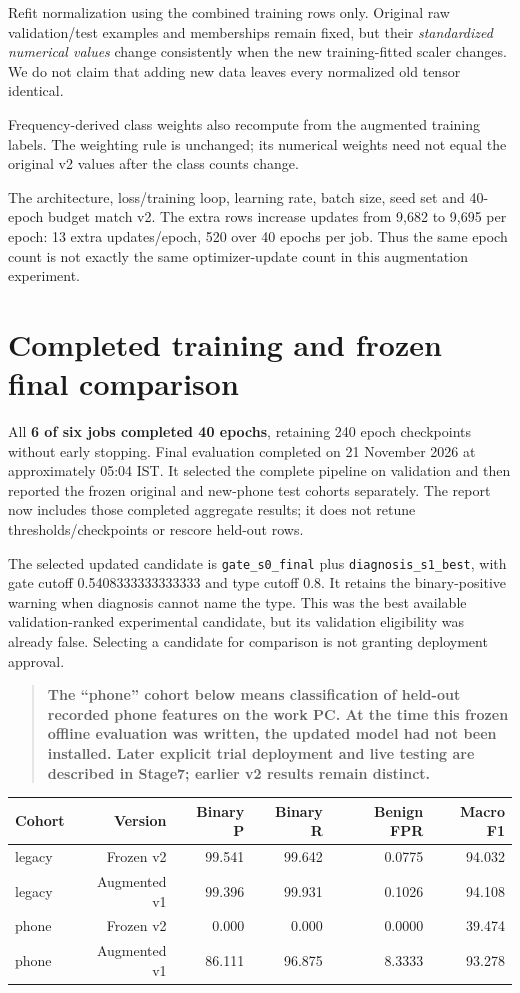 \documentclass[11pt,a4paper,oneside]{report}
\newcommand{\code}[1]{\nolinkurl{#1}}
\newcommand{\important}[1]{\begin{quote}\color{blue!45!black}\textbf{#1}\end{quote}}
\begin{document}
Refit normalization using the combined training rows only. Original raw validation/test examples and memberships remain fixed, but their \emph{standardized numerical values} change consistently when the new training-fitted scaler changes. We do not claim that adding new data leaves every normalized old tensor identical.

Frequency-derived class weights also recompute from the augmented training labels. The weighting rule is unchanged; its numerical weights need not equal the original v2 values after the class counts change.

The architecture, loss/training loop, learning rate, batch size, seed set and 40-epoch budget match v2. The extra rows increase updates from 9,682 to 9,695 per epoch: 13 extra updates/epoch, 520 over 40 epochs per job. Thus the same epoch count is not exactly the same optimizer-update count in this augmentation experiment.

\section{Completed training and frozen final comparison}
All \textbf{6 of six jobs completed 40 epochs}, retaining 240 epoch checkpoints without early stopping. Final evaluation completed on 21 November 2026 at approximately 05:04 IST. It selected the complete pipeline on validation and then reported the frozen original and new-phone test cohorts separately. The report now includes those completed aggregate results; it does not retune thresholds/checkpoints or rescore held-out rows.

The selected updated candidate is \code{gate_s0_final} plus \code{diagnosis_s1_best}, with gate cutoff 0.5408333333333333 and type cutoff 0.8. It retains the binary-positive warning when diagnosis cannot name the type. This was the best available validation-ranked experimental candidate, but its validation eligibility was already false. Selecting a candidate for comparison is not granting deployment approval.

\important{The ``phone'' cohort below means classification of held-out recorded phone features on the work PC. At the time this frozen offline evaluation was written, the updated model had not been installed. Later explicit trial deployment and live testing are described in Stage7; earlier v2 results remain distinct.}


{\small
\begin{longtable}{@{}lrrrrr@{}}
\toprule
Cohort & Version & Binary P & Binary R & Benign FPR & Macro F1\\\midrule\endhead
legacy & Frozen v2 & 99.541 & 99.642 & 0.0775 & 94.032\\
legacy & Augmented v1 & 99.396 & 99.931 & 0.1026 & 94.108\\
phone & Frozen v2 & 0.000 & 0.000 & 0.0000 & 39.474\\
phone & Augmented v1 & 86.111 & 96.875 & 8.3333 & 93.278\\
\bottomrule\end{longtable}
}
\end{document}
